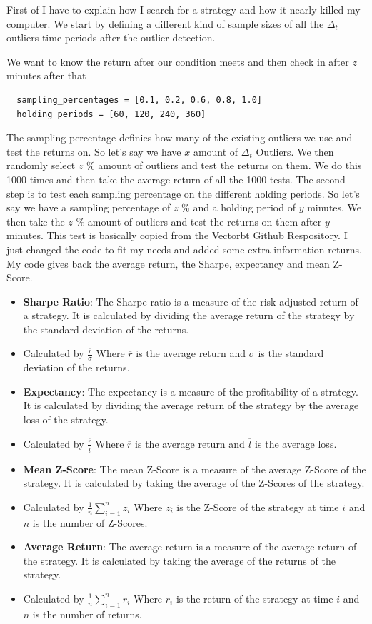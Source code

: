 \documentclass[12pt]{article}
\begin{document}
First of I have to explain how I search for a strategy and how it nearly killed my computer. 
We start by defining a different kind of sample sizes of all the $\Delta_t$ outliers time periods after the outlier detection.


We want to know the return after our condition meets and then check in after $z$ minutes after that
\begin{verbatim}
  sampling_percentages = [0.1, 0.2, 0.6, 0.8, 1.0]
  holding_periods = [60, 120, 240, 360]  
\end{verbatim}

The sampling percentage definies how many of the existing outliers we use and test the returns on. So let's say we have $x$ amount of $\Delta_t$ Outliers. We then randomly select $z$ \% amount of outliers and test the returns on them. We do this 1000 times and then take the average return of all the 1000 tests.
The second step is to test each sampling percentage on the different holding periods. So let's say we have a sampling percentage of $z$ \% and a holding period of $y$ minutes. We then take the $z$ \% amount of outliers and test the returns on them after $y$ minutes. This test is basically copied from the Vectorbt Github Respository. I just changed the code to fit my needs and added some extra information returns. My code gives back the average return, the Sharpe, expectancy and mean Z-Score.

\begin{itemize}
  \item \textbf{Sharpe Ratio}: The Sharpe ratio is a measure of the risk-adjusted return of a strategy. It is calculated by dividing the average return of the strategy by the standard deviation of the returns.
  \item Calculated by $\frac{\overline{r}}{\sigma}$ Where $\overline{r}$ is the average return and $\sigma$ is the standard deviation of the returns.
  \item \textbf{Expectancy}: The expectancy is a measure of the profitability of a strategy. It is calculated by dividing the average return of the strategy by the average loss of the strategy.
  \item Calculated by $\frac{\overline{r}}{\overline{l}}$ Where $\overline{r}$ is the average return and $\overline{l}$ is the average loss.
  \item \textbf{Mean Z-Score}: The mean Z-Score is a measure of the average Z-Score of the strategy. It is calculated by taking the average of the Z-Scores of the strategy.
  \item Calculated by $\frac{1}{n}\sum_{i=1}^{n} z_i$ Where $z_i$ is the Z-Score of the strategy at time $i$ and $n$ is the number of Z-Scores.
  \item \textbf{Average Return}: The average return is a measure of the average return of the strategy. It is calculated by taking the average of the returns of the strategy.
  \item Calculated by $\frac{1}{n}\sum_{i=1}^{n} r_i$ Where $r_i$ is the return of the strategy at time $i$ and $n$ is the number of returns.



\end{itemize}
\end{document}
